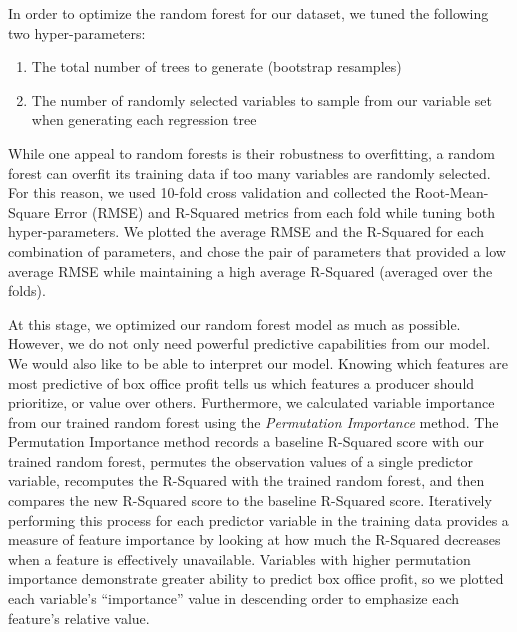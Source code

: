 \documentclass[10pt]{article}
\begin{document}
In order to optimize the random forest for our dataset, we tuned the following two hyper-parameters:

\begin{enumerate}
\item The total number of trees to generate (bootstrap resamples) 
\item The number of randomly selected variables to sample from our variable set when generating each regression tree
\end{enumerate}

While one appeal to random forests is their robustness to overfitting, a random forest can overfit its training data if too many variables are randomly selected. For this reason, we used 10-fold cross validation and collected the Root-Mean-Square Error (RMSE) and R-Squared metrics from each fold while tuning both hyper-parameters. We plotted the average RMSE and the R-Squared for each combination of parameters, and chose the pair of parameters that provided a low average RMSE while maintaining a high average R-Squared (averaged over the folds). 

At this stage, we optimized our random forest model as much as possible. However, we do not only need powerful predictive capabilities from our model. We would also like to be able to interpret our model. Knowing which features are most predictive of box office profit tells us which features a producer should prioritize, or value over others. Furthermore, we calculated variable importance from our trained random forest using the \textit{Permutation Importance} method. The Permutation Importance method records a baseline R-Squared score with our trained random forest, permutes the observation values of a single predictor variable, recomputes the R-Squared with the trained random forest, and then compares the new R-Squared score to the baseline R-Squared score. Iteratively performing this process for each predictor variable in the training data provides a measure of feature importance by looking at how much the R-Squared decreases when a feature is effectively unavailable. Variables with higher permutation importance demonstrate greater ability to predict box office profit, so we plotted each variable’s “importance” value in descending order to emphasize each feature’s relative value. 
\end{document}
